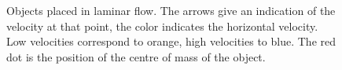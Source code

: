 \begin{figure}[ht!]
       
 \caption{Objects placed in laminar flow. The arrows give an indication of the velocity at that point, the color indicates the horizontal velocity. Low velocities correspond to orange, high velocities to blue. The red dot is the position of the centre of mass of the object. }
\label{fig:flow2}

\end{figure}
